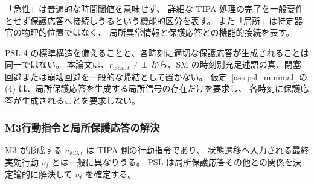 \begin{remark}
\label{rem:psl4_no_deliberation}
「急性」は普遍的な時間閾値を意味せず、
詳細な TIPA 処理の完了を一般要件とせず保護応答へ接続しうるという機能的区分を表す。
また「局所」は特定器官の物理的位置ではなく、
局所異常情報と保護応答との機能的接続を表す。
\end{remark}

\begin{remark}
\label{rem:psl4_required}
PSL-4 の標準構造を備えることと、各時刻に適切な保護応答が生成されることは同一ではない。
本論文は、$r_{\mathrm{local},t}\neq\bot$ から、SM の時刻別充足述語の真、閉塞回避または崩壊回避を一般的な帰結として置かない。
仮定~\ref{ass:psl_minimal} の (4) は、局所保護応答を生成する局所信号の存在だけを要求し、
各時刻に保護応答が生成されることを要求しない。
\end{remark}

\subsubsection{M3行動指令と局所保護応答の解決}
\label{subsubsec:effective_action_resolution}

M3 が形成する $u_{\mathrm{M3},t}$ は TIPA 側の行動指令であり、
状態遷移へ入力される最終実効行動 $u_t$ とは一般に異なりうる。
PSL は局所保護応答その他との関係を決定論的に解決して $u_t$ を確定する。

